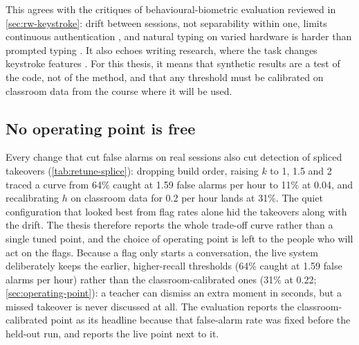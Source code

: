 This agrees with the critiques of behavioural-biometric evaluation reviewed in
\cref{sec:rw-keystroke}: drift between sessions, not separability within one,
limits continuous authentication \cite{eberz2017evaluating}, and natural typing
on varied hardware is harder than prompted typing
\cite{sun2016buffalo,murphy2017clarkson}. It also echoes writing research, where
the task changes keystroke features \cite{conijn2019keystroke}. For this
thesis, it means that synthetic results are a test of the code, not of the
method, and that any threshold must be calibrated on classroom data from the
course where it will be used.

\subsection{No operating point is free}
Every change that cut false alarms on real sessions also cut detection of
spliced takeovers (\cref{tab:retune-splice}): dropping build order, raising
$k$ to 1, 1.5 and 2 traced a curve from 64\% caught at 1.59 false alarms per hour
to 11\% at 0.04, and recalibrating $h$ on classroom data for 0.2 per hour lands
at 31\%. The quiet configuration that looked best from flag rates alone
hid the takeovers along with the drift. The thesis therefore reports the whole
trade-off curve rather than a single tuned point, and the choice of operating
point is left to the people who will act on the flags. Because a flag only starts a conversation, the live system deliberately keeps
the earlier, higher-recall thresholds (64\% caught at 1.59 false alarms per
hour) rather than the classroom-calibrated ones (31\% at 0.22;
\cref{sec:operating-point}): a teacher can dismiss an extra moment in seconds,
but a missed takeover is never discussed at all. The evaluation reports the
classroom-calibrated point as its headline because that false-alarm rate was
fixed before the held-out run, and reports the live point next to it.

